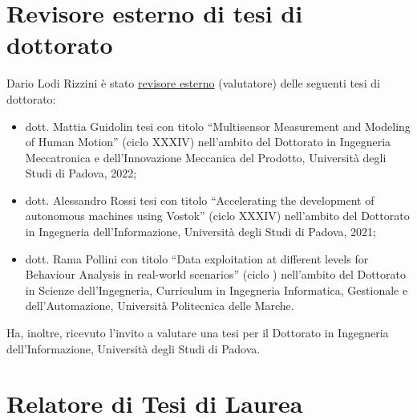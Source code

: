 \documentclass[11pt]{article}
\begin{document}
\section*{Revisore esterno di tesi di dottorato}

Dario Lodi Rizzini \`e stato \underline{revisore esterno} (valutatore) delle seguenti tesi di dottorato:  
%
\begin{itemize}
\item dott. Mattia Guidolin tesi con titolo ``Multisensor Measurement and Modeling of Human Motion'' (ciclo XXXIV) nell'ambito del Dottorato in Ingegneria Meccatronica e dell'Innovazione Meccanica del Prodotto, Universit\`a degli Studi di Padova, 2022; 
\item dott. Alessandro Rossi tesi con titolo ``Accelerating the development of autonomous machines using Vostok'' (ciclo XXXIV) nell'ambito del Dottorato in Ingegneria dell'Informazione, Universit\`a degli Studi di Padova, 2021; 
\item dott. Rama Pollini con titolo ``Data exploitation at different levels for Behaviour Analysis in real-world scenarios'' (ciclo ) nell'ambito del Dottorato in Scienze dell'Ingegneria, Curriculum in Ingegneria Informatica, Gestionale e dell'Automazione, Universit\`a Politecnica delle Marche. 
\end{itemize}
%
Ha, inoltre, ricevuto l'invito a valutare una tesi per il Dottorato in Ingegneria dell'Informazione, Universit\`a degli Studi di Padova.  

\section*{Relatore di Tesi di Laurea}
\end{document}
